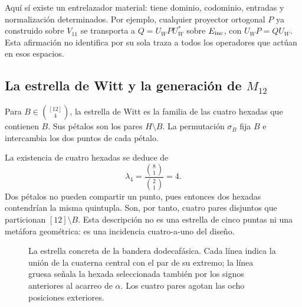 Aquí sí existe un entrelazador material: tiene dominio, codominio,
entradas y normalización determinados. Por ejemplo, cualquier
proyector ortogonal $P$ ya construido sobre $V_{11}$ se transporta a
$Q=U_WPU_W^*$ sobre $E_{\rm inc}$, con
$U_WP=QU_W$. Esta afirmación no identifica por su sola traza a todos
los operadores que actúan en esos espacios.



\subsection{La estrella de Witt y la generación de \texorpdfstring{$M_{12}$}{M12}}
\label{exc:estrella}

\begin{definition}
\label{exc:def-estrella}
Para $B\in\binom{[12]}4$, la estrella de Witt es la familia de las
cuatro hexadas que contienen $B$. Sus pétalos son los pares $H\setminus B$.
La permutación $\sigma_B$ fija $B$ e intercambia los dos puntos de cada
pétalo.
\end{definition}

La existencia de cuatro hexadas se deduce de
\[
 \lambda_4=\frac{\binom81}{\binom21}=4.
\]
Dos pétalos no pueden compartir un punto, pues entonces dos hexadas
contendrían la misma quintupla. Son, por tanto, cuatro pares disjuntos
que particionan $[12]\setminus B$. Esta descripción no es una estrella
de cinco puntas ni una metáfora geométrica: es una incidencia
cuatro-a-uno del diseño.

\begin{figure}[htbp]
\centering
{}
\caption{La estrella concreta de la bandera dodecafásica. Cada línea
indica la unión de la cuaterna central con el par de su extremo; la
línea gruesa señala la hexada seleccionada también por los signos
anteriores al acarreo de $\alpha$. Los cuatro pares agotan las ocho
posiciones exteriores.}
\label{exc:fig-estrella}
\end{figure}

